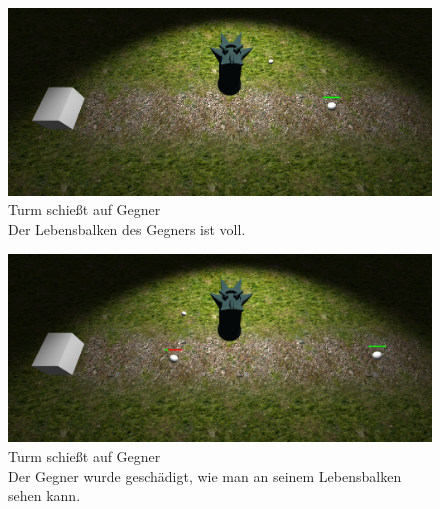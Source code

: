\begin{figure}[h]
\centering
\includegraphics[width=0.9\linewidth]{./images/Kapitel_Ergebnis_und_Ausblick/Tower_schiesst_1}
\caption[Turm schießt auf Gegner]{Turm schießt auf Gegner\\Der Lebensbalken des Gegners ist voll.}
\label{fig:Tower_schiesst_1}
\end{figure}

\begin{figure}[h]
\centering
\includegraphics[width=0.9\linewidth]{./images/Kapitel_Ergebnis_und_Ausblick/Tower_schiesst_2}
\caption[Turm schießt auf Gegner]{Turm schießt auf Gegner\\Der Gegner wurde geschädigt, wie man an seinem Lebensbalken sehen kann.}
\label{fig:Tower_schiesst_2}
\end{figure}

